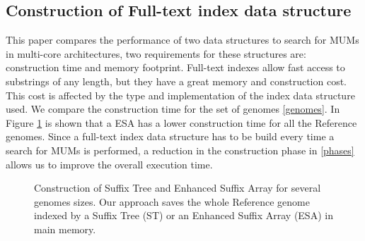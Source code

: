 \documentclass{acm_proc_article-sp}
\begin{document}
\subsection{Construction of Full-text index data structure}
This paper compares the performance of two data structures to search for MUMs in multi-core architectures, two requirements for these structures are: construction time and memory footprint. Full-text indexes allow fast access to substrings of any length, but they have a great memory and construction cost. This cost is affected by the type and implementation of the index data structure used. We compare the construction time for the set of genomes \ref{genomes}. In Figure \ref{fig:construction} is shown that a ESA has a lower construction time for all the Reference genomes. Since a full-text index data structure has to be build every time a search for MUMs is performed, a reduction in the construction phase in \ref{phases} allows us to improve the overall execution time.
\begin{figure}
  \centering
  \caption{Construction of Suffix Tree and Enhanced Suffix Array for several genomes sizes. Our approach saves the whole Reference genome indexed by a Suffix Tree (ST) or an Enhanced Suffix Array (ESA) in main memory.}
  \label{fig:construction}
 \end{figure}  
\end{document}
